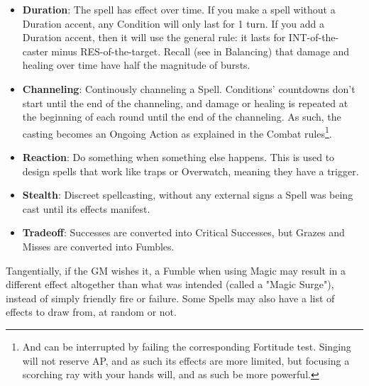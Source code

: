 \begin{itemize}
    \item \textbf{Duration}: The spell has effect over time. If you make a spell without a Duration accent, any Condition will only last for 1 turn. If you add a Duration accent, then it will use the general rule: it  lasts for INT-of-the-caster minus RES-of-the-target. Recall (see in Balancing) that damage and healing over time have half the magnitude of bursts.
    \item \textbf{Channeling}: Continously channeling a Spell. Conditions' countdowns don't start until the end of the channeling, and damage or healing is repeated at the beginning of each round until the end of the channeling. As such, the casting becomes an Ongoing Action as explained in the Combat rules\footnote{And can be interrupted by failing the corresponding Fortitude test. Singing will not reserve AP, and as such its effects are more limited, but focusing a scorching ray with your hands will, and as such be more powerful.}.
    \item \textbf{Reaction}: Do something when something else happens. This is used to design spells that work like traps or Overwatch, meaning they have a trigger.
    \item \textbf{Stealth}: Discreet spellcasting, without any external signs a Spell was being cast until its effects manifest.
    \item \textbf{Tradeoff}: Successes are converted into Critical Successes, but Grazes and Misses are converted into Fumbles.    
\end{itemize}

Tangentially, if the GM wishes it, a Fumble when using Magic may result in a different effect altogether than what was intended (called a "Magic Surge"), instead of simply friendly fire or failure. Some Spells may also have a list of effects to draw from, at random or not.